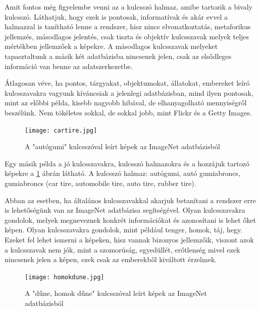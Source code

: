 \documentclass[12pt, a4paper, oneside]{book}
\theoremstyle{tetel}
\begin{document}
	Amit fontos még figyelembe venni az a kulcsszó halmaz, amibe tartozik a bivaly kulcsszó. Láthatjuk, hogy ezek is pontosak, informatívak és akár evvel a halmazzal is tanítható lenne a rendszer, hisz nincs elvonatkoztatás, metaforikus jellemzés, másodlagos jelentés, csak tiszta és objektív kulcsszavak melyek teljes mértékben jellemzőek a képekre. A másodlagos kulcsszavak melyeket tapasztaltunk a másik két adatbázisba nincsenek jelen, csak az elsődleges információ van benne az adatszerkezetbe.

	Átlagosan véve, ha pontos, tárgyakat, objektumokat, állatokat, embereket leíró kulcsszavakra vagyunk kíváncsiak a jelenlegi adatbázisban, mind ilyen pontosak, mint az előbbi példa, kisebb nagyobb hibával, de elhanyagolható mennyiségről beszélünk. Nem tökéletes sokkal, de sokkal jobb, mint  Flickr\cite{1} és a Getty Images\cite{2}.

\vspace{0.4cm}
\begin{figure}[h]
\begin{center}
\texttt{[image: cartire.jpg]}
\caption{{A "autógumi" kulcsszóval leírt képek az ImageNet\cite{3} adatbázisból}}
\label{cartire}
\end{center}
\end{figure}

	Egy másik példa a jó kulcsszavakra, kulcsszó halmazokra és a hozzájuk tartozó képekre a \ref{cartire} ábrán látható. A kulcsszó halmaz: autógumi, autó gumiabroncs, gumiabroncs (car tire, automobile tire, auto tire, rubber tire).

	Abban az esetben, ha általános kulcsszavakkal akarjuk betanítani a rendszer erre is lehetőségünk van az ImageNet \cite{3}adatbázisa segítségével. Olyan kulcsszavakra gondolok, melyek megneveznek konkrét információkat és azonosítani is lehet őket képen. Olyan kulcsszavakra gondolok, mint például tenger, homok, táj, hegy. Ezeket fel lehet ismerni a képeken, hisz vannak bizonyos jellemzőik, viszont azok a kulcsszavak nem jók, mint a szomorúság, egyedüllét, erőtlenség mivel ezek nincsenek jelen a képen, ezek csak az emberekből kiváltott érzelmek. 

\vspace{0.4cm}
\begin{figure}[h]
\begin{center}
\texttt{[image: homokdune.jpg]}
\caption{{A "dűne, homok dűne" kulcsszóval leírt képek az ImageNet\cite{3} adatbázisból}}
\label{homokdune}
\end{center}
\end{figure}
\end{document}
